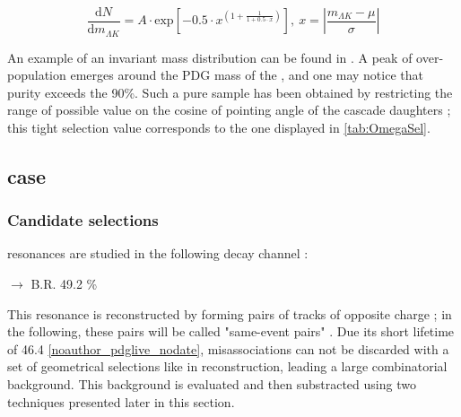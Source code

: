 \begin{equation}
\frac{\text{d}N}{\text{d}m_{\Lambda K}} = A \cdot \text{exp}[-0.5 \cdot x^{(1 + \frac{1}{1+0.5 \cdot x})}], \ x = \left | \frac{m_{\Lambda K} - \mu}{\sigma} \right |
\end{equation}\label{eq:OmegaSignal}

An example of an invariant mass distribution can be found in \fig. A peak of over-population emerges around the PDG mass of the \rmOmega, and one may notice that purity exceeds the 90\%. Such a pure sample has been obtained by restricting the range of possible value on the cosine of pointing angle of the cascade daughters ; this tight selection value corresponds to the one displayed in \tab \ref{tab:OmegaSel}.

\subsection{\rmPhiMes case}
\label{sec:Section04.b-}

\subsubsection{Candidate selections}

\rmPhiMes resonances are studied in the following decay channel :

\rmPhiMes [$s\bar{s}$] $\rightarrow$ \Kplus [$u\bar{s}$] \Kminus [$\bar{u} s$]  \qquad \textsc{B.R. 49.2 \%}

This resonance is reconstructed by forming pairs of tracks of opposite charge ; in the following, these pairs will be called "same-event pairs" . Due its short lifetime of 46.4 \fm \ref{noauthor_pdglive_nodate}, misassociations can not be discarded with a set of geometrical selections like in \rmOmega reconstruction, leading a large combinatorial background. This background is evaluated and then substracted using two techniques presented later in this section.


